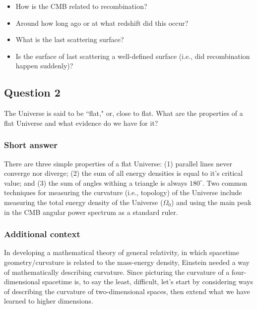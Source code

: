 \documentclass[a4paper,11pt]{article}
\begin{document}
\begin{itemize}
    \item How is the CMB related to recombination?
    \item Around how long ago or at what redshift did this occur?
    \item What is the last scattering surface?
    \item Is the surface of last scattering a well-defined surface (i.e., did recombination happen suddenly)?
\end{itemize}

%
%

\newpage
\subsection{Question 2}

The Universe is said to be ``flat," or, close to flat. What are the properties of a flat Universe and what evidence do we have for it?

\subsubsection{Short answer}

There are three simple properties of a flat Universe: (1) parallel lines never converge nor diverge; (2) the sum of all energy densities is equal to it's critical value; and (3) the sum of angles withing a triangle is always $180^\circ$. Two common techniques for measuring the curvature (i.e., topology) of the Universe include measuring the total energy density of the Universe ($\Omega_0$) and using the main peak in the CMB angular power spectrum as a standard ruler.

\subsubsection{Additional context}

In developing a mathematical theory of general relativity, in which spacetime geometry/curvature is related to the mass-energy density, Einstein needed a way of mathematically describing curvature. Since picturing the curvature of a four-dimensional spacetime is, to say the least, difficult, let's start by considering ways of describing the curvature of two-dimensional spaces, then extend what we have learned to higher dimensions.
\end{document}
